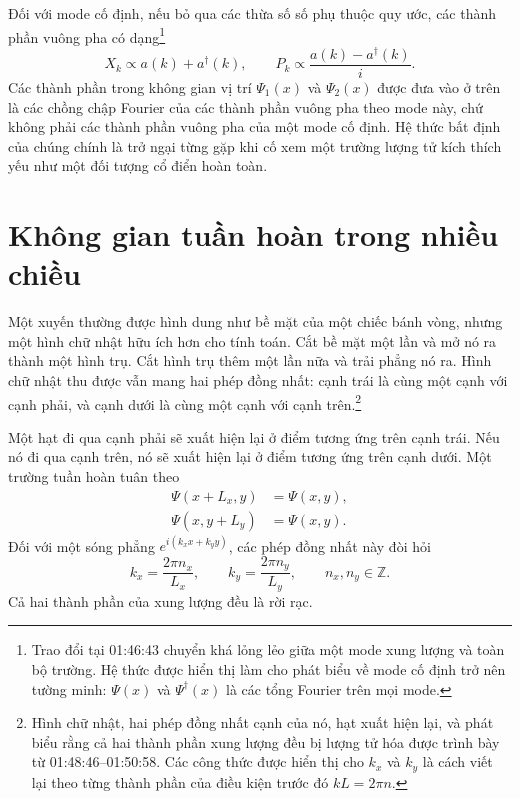 Đối với mode cố định, nếu bỏ qua các thừa số số phụ thuộc quy ước, các thành phần vuông pha có dạng\footnote{Trao đổi tại 01:46:43 chuyển khá lỏng lẻo giữa một mode xung lượng và toàn bộ trường. Hệ thức được hiển thị làm cho phát biểu về mode cố định trở nên tường minh: \(\Psi(x)\) và \(\Psi^\dagger(x)\) là các tổng Fourier trên mọi mode.}
\begin{equation}
X_k\propto a(k)+a^\dagger(k),
\qquad
P_k\propto \frac{a(k)-a^\dagger(k)}{i}.
\end{equation}
Các thành phần trong không gian vị trí \(\Psi_1(x)\) và \(\Psi_2(x)\) được đưa vào ở trên là các chồng chập Fourier của các thành phần vuông pha theo mode này, chứ không phải các thành phần vuông pha của một mode cố định. Hệ thức bất định của chúng chính là trở ngại từng gặp khi cố xem một trường lượng tử kích thích yếu như một đối tượng cổ điển hoàn toàn.

\section{Không gian tuần hoàn trong nhiều chiều}

\begin{classroomqa}
\end{classroomqa}

Một xuyến thường được hình dung như bề mặt của một chiếc bánh vòng, nhưng một hình chữ nhật hữu ích hơn cho tính toán. Cắt bề mặt một lần và mở nó ra thành một hình trụ. Cắt hình trụ thêm một lần nữa và trải phẳng nó ra. Hình chữ nhật thu được vẫn mang hai phép đồng nhất: cạnh trái là cùng một cạnh với cạnh phải, và cạnh dưới là cùng một cạnh với cạnh trên.\footnote{Hình chữ nhật, hai phép đồng nhất cạnh của nó, hạt xuất hiện lại, và phát biểu rằng cả hai thành phần xung lượng đều bị lượng tử hóa được trình bày từ 01:48:46--01:50:58. Các công thức được hiển thị cho \(k_x\) và \(k_y\) là cách viết lại theo từng thành phần của điều kiện trước đó \(kL=2\pi n\).}

Một hạt đi qua cạnh phải sẽ xuất hiện lại ở điểm tương ứng trên cạnh trái. Nếu nó đi qua cạnh trên, nó sẽ xuất hiện lại ở điểm tương ứng trên cạnh dưới. Một trường tuần hoàn tuân theo
\begin{align}
\Psi(x+L_x,y)&=\Psi(x,y),\\
\Psi(x,y+L_y)&=\Psi(x,y).
\end{align}
Đối với một sóng phẳng \(e^{i(k_x x+k_y y)}\), các phép đồng nhất này đòi hỏi
\begin{equation}
k_x=\frac{2\pi n_x}{L_x},
\qquad
k_y=\frac{2\pi n_y}{L_y},
\qquad
n_x,n_y\in\mathbb Z.
\end{equation}
Cả hai thành phần của xung lượng đều là rời rạc.

